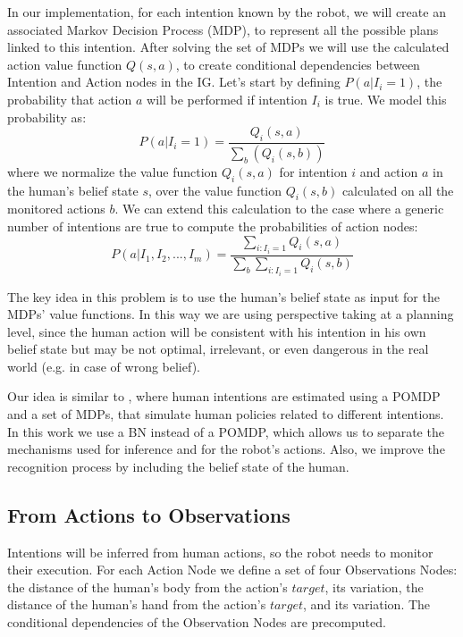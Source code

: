 In our implementation, for each intention known by the robot, we will create an associated Markov Decision Process (MDP), to represent all the possible plans linked to this intention. After solving the set of MDPs we will use the calculated action value function \(Q(s,a)\), to create conditional dependencies between Intention and Action nodes in the IG. Let's start by defining \(P(a|I_i=1)\), the probability that action $a$ will be performed if intention $I_i$ is true. We model this probability as:
\begin{equation}
 P(a|I_i=1)=\frac{Q_i(s,a)}{\sum_b(Q_i(s,b))}
\end{equation}
  where we normalize the value function $Q_i(s,a)$ for intention $i$ and action $a$ in the human's belief state $s$, over the value function $Q_i(s,b)$ calculated on all the monitored actions $b$. We can extend this calculation to the case where a generic number of intentions are true to compute the probabilities of action nodes: 
\begin{equation}
  P(a|I_1,I_2,...,I_m)=\frac{\sum_{i:I_i=1}Q_i(s,a)}{\sum_b\sum_{i:I_i=1}Q_i(s,b)}
\end{equation}

The key idea in this problem is to use the human's belief state as input for the MDPs' value functions. In this way we are using perspective taking at a planning level, since the human action will be consistent with his intention in his own belief state but may be not optimal, irrelevant, or even dangerous in the real world (e.g. in case of wrong belief).

Our idea is similar to \cite{karami2010human}, where human intentions are estimated using a POMDP and a set of MDPs, that simulate human policies related to different intentions. In this work we use a BN instead of a POMDP, which allows us to separate the mechanisms used for inference and for the robot's actions. Also, we improve the recognition process by including the belief state of the human.

\subsection{From Actions to Observations}
Intentions will be inferred from human actions, so the robot needs to monitor their execution. For each Action Node we define a set of four Observations Nodes: the distance of the human's body from the action's $target$, its variation, the distance of the human's hand from the action's $target$, and its variation. The conditional dependencies of the Observation Nodes are precomputed.

